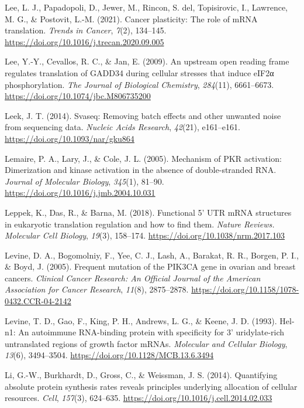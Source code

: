 \documentclass[12pt,openany]{book}
\begin{document}
\hypertarget{ref-Lee2021}{}
Lee, L. J., Papadopoli, D., Jewer, M., Rincon, S. del, Topisirovic, I.,
Lawrence, M. G., \& Postovit, L.-M. (2021). Cancer plasticity: The role
of mRNA translation. \emph{Trends in Cancer}, \emph{7}(2), 134--145.
\url{https://doi.org/10.1016/j.trecan.2020.09.005}

\hypertarget{ref-Lee2009}{}
Lee, Y.-Y., Cevallos, R. C., \& Jan, E. (2009). An upstream open reading
frame regulates translation of GADD34 during cellular stresses that
induce eIF2α phosphorylation. \emph{The Journal of Biological
Chemistry}, \emph{284}(11), 6661--6673.
\url{https://doi.org/10.1074/jbc.M806735200}

\hypertarget{ref-Leek2014}{}
Leek, J. T. (2014). Svaseq: Removing batch effects and other unwanted
noise from sequencing data. \emph{Nucleic Acids Research},
\emph{42}(21), e161--e161. \url{https://doi.org/10.1093/nar/gku864}

\hypertarget{ref-Lemaire2005}{}
Lemaire, P. A., Lary, J., \& Cole, J. L. (2005). Mechanism of PKR
activation: Dimerization and kinase activation in the absence of
double-stranded RNA. \emph{Journal of Molecular Biology}, \emph{345}(1),
81--90. \url{https://doi.org/10.1016/j.jmb.2004.10.031}

\hypertarget{ref-Leppek2018}{}
Leppek, K., Das, R., \& Barna, M. (2018). Functional 5' UTR mRNA
structures in eukaryotic translation regulation and how to find them.
\emph{Nature Reviews. Molecular Cell Biology}, \emph{19}(3), 158--174.
\url{https://doi.org/10.1038/nrm.2017.103}

\hypertarget{ref-Levine2005}{}
Levine, D. A., Bogomolniy, F., Yee, C. J., Lash, A., Barakat, R. R.,
Borgen, P. I., \& Boyd, J. (2005). Frequent mutation of the PIK3CA gene
in ovarian and breast cancers. \emph{Clinical Cancer Research: An
Official Journal of the American Association for Cancer Research},
\emph{11}(8), 2875--2878.
\url{https://doi.org/10.1158/1078-0432.CCR-04-2142}

\hypertarget{ref-Levine1993}{}
Levine, T. D., Gao, F., King, P. H., Andrews, L. G., \& Keene, J. D.
(1993). Hel-n1: An autoimmune RNA-binding protein with specificity for
3' uridylate-rich untranslated regions of growth factor mRNAs.
\emph{Molecular and Cellular Biology}, \emph{13}(6), 3494--3504.
\url{https://doi.org/10.1128/MCB.13.6.3494}

\hypertarget{ref-Li2014}{}
Li, G.-W., Burkhardt, D., Gross, C., \& Weissman, J. S. (2014).
Quantifying absolute protein synthesis rates reveals principles
underlying allocation of cellular resources. \emph{Cell}, \emph{157}(3),
624--635. \url{https://doi.org/10.1016/j.cell.2014.02.033}
\end{document}
